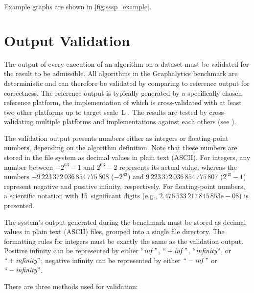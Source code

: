 Example graphs are shown in \autoref{fig:sssp_example}.




\section{Output Validation}
\label{sec:definitions_validation}

The output of every execution of an algorithm on a dataset must be validated for the result to be admissible. All algorithms in the Graphalytics benchmark are deterministic and can therefore be validated by comparing to reference output for correctness. The reference output is typically generated by a specifically chosen reference platform, the implementation of which is cross-validated with at least two other platforms up to target scale~L . The results are tested by cross-validating multiple platforms and implementations against each others (see ).

The validation output presents numbers either as integers or floating-point numbers, depending on the algorithm definition. Note that these numbers are stored in the file system as decimal values in plain text (ASCII). For integers, any number between $-2^{63}-1$ and $2^{63}-2$ represents its actual value, whereas the numbers ${-9\,223\,372\,036\,854\,775\,808}$ ($-2^{63}$) and $9\,223\,372\,036\,854\,775\,807$ ($2^{63}-1$) represent negative and positive infinity, respectively.
For floating-point numbers, a scientific notation with 15~significant digits (e.g., $2.476\,533\,217\,845\,853\mathrm{e-}08$) is presented.

The system's output generated during the benchmark must be stored as decimal values in plain text (ASCII) files, grouped into a single file directory. The formatting rules for integers must be exactly the same as the validation output. Positive infinity can be represented by either $``\textit{inf}\ "$, $``+\textit{inf}\ "$, $``\textit{infinity}"$, or $``+\textit{infinity}"$; negative infinity can be represented by either $``-\textit{inf}\ "$ or $``-\textit{infinity}"$.

There are three methods used for validation:

